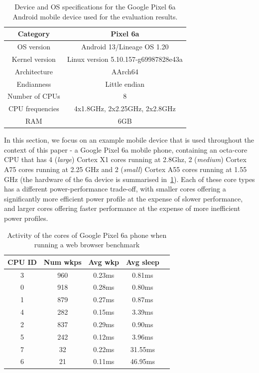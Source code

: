 \documentclass[conference]{IEEEtran}
\begin{document}
\begin{table}[ht]
\renewcommand{\arraystretch}{1.3}
\caption{Device and OS specifications for the Google Pixel 6a Android mobile device used for the evaluation results.}
\label{tab:devicespecs}
\centering
\begin{tabular}{|c|c|}
\hline 
\textbf{Category} & \textbf{Pixel 6a} \\ %
\hline
      OS version & Android 13/Lineage OS 1.20 \\
      Kernel version & Linux version 5.10.157-g69987828e43a \\
      Architecture & AArch64 \\
      Endianness & Little endian \\
      Number of CPUs & 8  \\
      CPU frequencies & 4x1.8GHz, 2x2.25GHz, 2x2.8GHz \\
      RAM & 6GB  \\
      \hline 
\end{tabular}
\end{table}

In this section, we focus on an example mobile device that is used throughout the context of this paper - a Google Pixel 6a mobile phone,  containing an octa-core CPU that has 4 (\emph{large}) Cortex X1 cores running at 2.8Ghz, 2 (\emph{medium}) Cortex A75 cores running at 2.25 GHz and 2 (\emph{small}) Cortex A55 cores running at 1.55 GHz (the hardware of the 6a  device is summarised in~\cref{tab:devicespecs}). Each of these core types has a different power-performance trade-off, with smaller cores offering a significantly more efficient power profile at the expense of slower performance, and larger cores offering faster performance at the expense of more inefficient power profiles.

\begin{table}
\renewcommand{\arraystretch}{1.3}
\caption{Activity of the cores of Google Pixel 6a phone when running a web browser benchmark}
\label{tab:actweb}
\centering
\begin{tabular}{|c|c|c|c|c|}
\hline
\textbf{CPU ID} & \textbf{Num wkps} & \textbf{Avg wkp} &  \textbf{Avg sleep} \\
\hline
      3 &  960 &     0.23ms &        0.81ms \\      
      0 &    918 &      0.28ms &           0.80ms \\
      1 &    879 &       0.27ms &          0.87ms \\
      4 &    282 &       0.15ms &           3.39ms \\
      2 &  837 &       0.29ms &          0.90ms \\
      5 &    242 &       0.12ms &             3.96ms \\
      7 &     32 &       0.22ms &            31.55ms \\
      6 &     21 &       0.11ms &           46.95ms \\ 
      \hline
\end{tabular}
\end{table}
\end{document}

